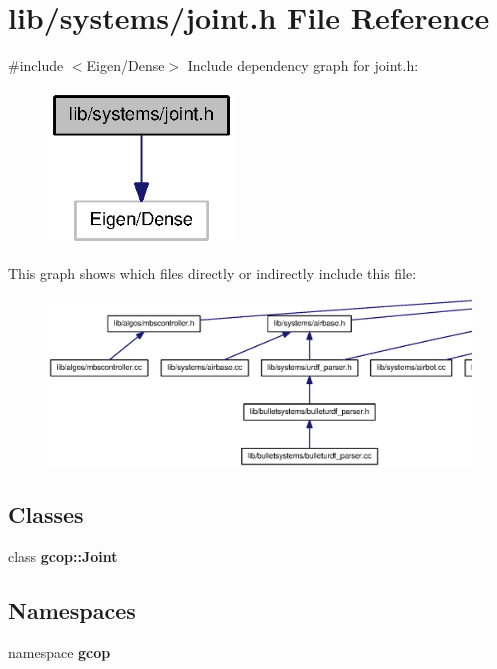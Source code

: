 \section{lib/systems/joint.h \-File \-Reference}
\label{joint_8h}
{\ttfamily \#include $<$\-Eigen/\-Dense$>$}\*
\-Include dependency graph for joint.\-h\-:\nopagebreak
\begin{figure}[H]
\begin{center}
\leavevmode
\includegraphics[width=140pt]{joint_8h__incl}
\end{center}
\end{figure}
\-This graph shows which files directly or indirectly include this file\-:
\nopagebreak
\begin{figure}[H]
\begin{center}
\leavevmode
\includegraphics[width=350pt]{joint_8h__dep__incl}
\end{center}
\end{figure}
\subsection*{\-Classes}
\begin{DoxyCompactItemize}
\item 
class {\bf gcop\-::\-Joint}
\end{DoxyCompactItemize}
\subsection*{\-Namespaces}
\begin{DoxyCompactItemize}
\item 
namespace {\bf gcop}
\end{DoxyCompactItemize}

